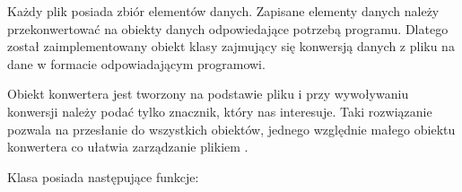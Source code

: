 
\par
Każdy plik \DICOM posiada zbiór elementów danych.
Zapisane elementy danych należy przekonwertować na obiekty danych odpowiedające potrzebą programu.
Dlatego został zaimplementowany obiekt klasy  zajmujący się konwersją danych z pliku \DICOM na dane w formacie odpowiadającym programowi.

\par
Obiekt konwertera jest tworzony na podstawie pliku \DICOM i przy wywoływaniu konwersji należy podać tylko znacznik, który nas interesuje.
Taki rozwiązanie pozwala na przesłanie do wszystkich obiektów, jednego względnie małego obiektu konwertera co ułatwia zarządzanie plikiem \DICOM.

\par
Klasa  posiada następujące funkcje:
